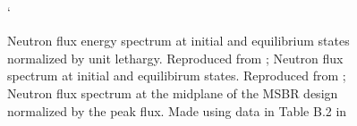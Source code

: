\begin{figure}[!htpb]
    \centering
    \\`
    \caption[Side-by-side results of MSBR spectra between Ryhklevskii et al (2019) and Park et al (2015)]{
     Neutron flux energy spectrum at
    initial and equilibrium states normalized by unit lethargy. Reproduced
    from \cite{rykhlevskii_modeling_2019}; 
    Neutron flux spectrum at initial and equilibirum states. Reproduced from
    \cite{park_whole_2015};  Neutron flux
    spectrum at the midplane of the MSBR design normalized by the peak flux. Made using data in Table B.2 in \cite{robertson_conceptual_1971}}
    \label{fig:msbr_spectrum_comp}
\end{figure}

